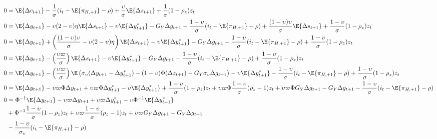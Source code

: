 \begin{align*}
    0 &= \E \{ \Delta c_{t+1}\} - \frac{1}{\sigma}(i_t - \E \{ \pi_{H,+1}\} - \rho) + \frac{\upsilon}{\sigma}\E \{ \Delta s_{t+1} \} + \frac{1}{\sigma}(1-\rho_z)z_t \\
    0  &= \E \{ \Delta y_{t+1}\}  - \upsilon(2-\upsilon)\eta \E \{\Delta s_{t+1} \} - \upsilon \E \{\Delta y_{t+1}^* \} -G_Y \Delta g_{t+1} - \frac{1-\upsilon}{\sigma}(i_t - \E \{ \pi_{H,+1}\} - \rho) + \frac{(1-\upsilon)\upsilon}{\sigma}\E \{ \Delta s_{t+1} \} + \frac{1-\upsilon}{\sigma}(1-\rho_z)z_t \\
    0  &= \E \{ \Delta y_{t+1}\}  + \left(\frac{(1-\upsilon)\upsilon}{\sigma} - \upsilon(2-\upsilon)\eta\right) \E \{\Delta s_{t+1} \} - \upsilon \E \{\Delta y_{t+1}^* \} -G_Y \Delta g_{t+1} - \frac{1-\upsilon}{\sigma}(i_t - \E \{ \pi_{H,+1}\} - \rho)  + \frac{1-\upsilon}{\sigma}(1-\rho_z)z_t \\
    0  &= \E \{ \Delta y_{t+1}\}  - \left(\frac{\upsilon \varpi}{\sigma}\right) \E \{\Delta s_{t+1} \} - \upsilon \E \{\Delta y_{t+1}^* \} -G_Y \Delta g_{t+1} - \frac{1-\upsilon}{\sigma}(i_t - \E \{ \pi_{H,+1}\} - \rho)  + \frac{1-\upsilon}{\sigma}(1-\rho_z)z_t \\
    0  &= \E \{ \Delta y_{t+1}\}  - \left(\frac{\upsilon \varpi}{\sigma}\right) \E \left( \sigma_\upsilon(\Delta y_{t+1} - \Delta y^*_{t+1}) - (1-\upsilon)\Phi (\Delta z_{t+1}) - G_Y \sigma_\upsilon \Delta g_{t+1} \right) - \upsilon \E \{\Delta y_{t+1}^* \} - \frac{1-\upsilon}{\sigma}(i_t - \E \{ \pi_{H,+1}\} - \rho)  + \frac{1-\upsilon}{\sigma}(1-\rho_z)z_t \\
    0  &= \E \{ \Delta y_{t+1}\} -\upsilon \varpi \Phi \Delta y_{t+1} + \upsilon \varpi \Phi \Delta y^*_{t+1} - \upsilon \E \{\Delta y_{t+1}^* \} + \frac{1-\upsilon}{\sigma}(1-\rho_z)z_t + \upsilon \varpi \Phi \frac{1-\upsilon}{\sigma} (\rho_z - 1)z_t + \upsilon \varpi\Phi G_Y \Delta g_{t+1} -G_Y \Delta g_{t+1} - \frac{1-\upsilon}{\sigma}(i_t - \E \{ \pi_{H,+1}\} - \rho)\\
    0  &= \Phi^{-1} \E \{ \Delta y_{t+1}\} -\upsilon \varpi \Delta y_{t+1} + \upsilon \varpi \Delta y^*_{t+1} - \upsilon \Phi^{-1} \E \{\Delta y_{t+1}^* \} \\
        &  +\Phi^{-1} \frac{1-\upsilon}{\sigma}(1-\rho_z)z_t + \upsilon \varpi \frac{1-\upsilon}{\sigma} (\rho_z - 1)z_t + \upsilon \varpi G_Y \Delta g_{t+1} -G_Y \Delta g_{t+1}\\
        &- \frac{1-\upsilon}{\sigma_\upsilon}(i_t - \E \{ \pi_{H,+1}\} - \rho)\\

\end{align*}
